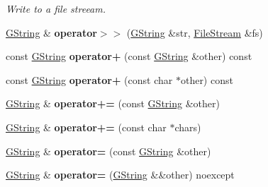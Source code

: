 \begin{DoxyCompactItemize}
\begin{DoxyCompactList}\small\item\em Write to a file streeam. \end{DoxyCompactList}\item 
\mbox{\label{classrev_1_1_g_string_ad3c5980f73dea393c9a0a9b15db65c63}} 
\mbox{\hyperlink{classrev_1_1_g_string}{G\+String}} \& {\bfseries operator$>$$>$} (\mbox{\hyperlink{classrev_1_1_g_string}{G\+String}} \&str, \mbox{\hyperlink{classrev_1_1_file_stream}{File\+Stream}} \&fs)
\item 
\mbox{\label{classrev_1_1_g_string_a9f4813e46b0be8bdee3ed699f2982bad}} 
const \mbox{\hyperlink{classrev_1_1_g_string}{G\+String}} {\bfseries operator+} (const \mbox{\hyperlink{classrev_1_1_g_string}{G\+String}} \&other) const
\item 
\mbox{\label{classrev_1_1_g_string_a85fb785a1ea9d70c6a8e6bd3e041f59f}} 
const \mbox{\hyperlink{classrev_1_1_g_string}{G\+String}} {\bfseries operator+} (const char $\ast$other) const
\item 
\mbox{\label{classrev_1_1_g_string_af3a38a0591ac971d9d2fd6d5f7bcf8cc}} 
\mbox{\hyperlink{classrev_1_1_g_string}{G\+String}} \& {\bfseries operator+=} (const \mbox{\hyperlink{classrev_1_1_g_string}{G\+String}} \&other)
\item 
\mbox{\label{classrev_1_1_g_string_a05a9b2212c0fa790fc2de95acd26a754}} 
\mbox{\hyperlink{classrev_1_1_g_string}{G\+String}} \& {\bfseries operator+=} (const char $\ast$chars)
\item 
\mbox{\label{classrev_1_1_g_string_a26888bb6fb9e0d14bab686580a6268cf}} 
\mbox{\hyperlink{classrev_1_1_g_string}{G\+String}} \& {\bfseries operator=} (const \mbox{\hyperlink{classrev_1_1_g_string}{G\+String}} \&other)
\item 
\mbox{\label{classrev_1_1_g_string_a363ffa5f51d970ba9eda0542d2bc7163}} 
\mbox{\hyperlink{classrev_1_1_g_string}{G\+String}} \& {\bfseries operator=} (\mbox{\hyperlink{classrev_1_1_g_string}{G\+String}} \&\&other) noexcept
\item 
\mbox{\label{classrev_1_1_g_string_a3a3b7ca2b0d46be687aaf24790fad4a8}} 

\end{DoxyCompactItemize}

